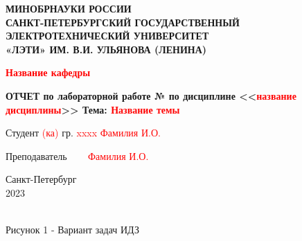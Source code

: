 \documentclass[12pt,a4paper]{article}
\date{}
\begin{document}
\begin{titlepage}
    \newpage

\begin{center}
	
	{\bfseries МИНОБРНАУКИ РОССИИ \\
		САНКТ-ПЕТЕРБУРГСКИЙ ГОСУДАРСТВЕННЫЙ\\
		ЭЛЕКТРОТЕХНИЧЕСКИЙ УНИВЕРСИТЕТ\\
		«ЛЭТИ» ИМ. В.И. УЛЬЯНОВА (ЛЕНИНА)}\\
	
	
	\vspace{0.25cm}
\end{center}
\begin{flushright}
	\begin{center}
		\textbf{\textcolor{red}{Название кафедры}}
	\end{center}
\end{flushright}  


\vspace{5cm}

\begin{center}
	
	\bfseries ОТЧЕТ \linebreak
	по лабораторной работе № \linebreak
	по дисциплине <<\textcolor{red}{название дисциплины}>> \linebreak
	Тема: \textcolor{red}{Название темы}
\end{center}

\vspace{3cm}

Студент \textcolor{red}{(ка)} гр. \textcolor{red}{xxxx} \hspace{7.07cm} \textcolor{red}{Фамилия И.О.}

Преподаватель ~~~\hspace{8cm} \textcolor{red}{Фамилия И.О.}

\vfill

\centering Санкт-Петербург \\ 2023

\end{titlepage}
\newpage
\setcounter{page}{2}

{
\\
}
{
\centering Рисунок 1 - Вариант задач ИДЗ\\
}
\end{document}
